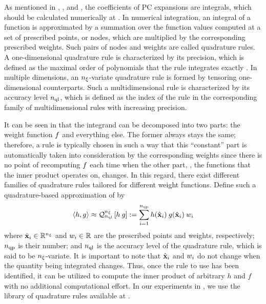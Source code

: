 As mentioned in , , and , the coefficients of PC expansions are integrals, which should be calculated numerically at .
In numerical integration, an integral of a function is approximated by a summation over the function values computed at a set of prescribed points, or nodes, which are multiplied by the corresponding prescribed weights.
Such pairs of nodes and weights are called quadrature rules.
A one-dimensional quadrature rule is characterized by its precision, which is defined as the maximal order of polynomials that the rule integrates exactly \cite{heiss2008}.
In multiple dimensions, an ${n_\xi}$-variate quadrature rule is formed by tensoring one-dimensional counterparts. Such a multidimensional rule is characterized by its accuracy level ${n_\text{ql}}$, which is defined as the index of the rule in the corresponding family of multidimensional rules with increasing precision.

It can be seen in  that the integrand can be decomposed into two parts: the weight function $f$ and everything else.
The former always stays the same; therefore, a rule is typically chosen in such a way that this ``constant'' part is automatically taken into consideration by the corresponding weights since there is no point of recomputing $f$ each time when the other part, \ie, the functions that the inner product operates on, changes.
In this regard, there exist different families of quadrature rules tailored for different weight functions.
Define such a quadrature-based approximation of  by
\begin{equation} \elabel{quadrature}
  \oInner{h}{g} \approx \oQuad{\nvars}{\qdlevel}{h \: g} := \sum_{i = 1}^{\qdorder} h(\qdn{\vX}_i) \: g(\qdn{\vX}_i) \: \qdw_i
\end{equation}
where $\hat{\mathbf{x}}_i \in \mathbb{R}^{n_\xi}$ and $w_i \in \mathbb{R}$ are the prescribed points and weights, respectively; ${n_\text{qp}}$ is their number; and ${n_\text{ql}}$ is the accuracy level of the quadrature rule, which is said to be ${n_\xi}$-variate.
It is important to note that $\hat{\mathbf{x}}_i$ and $w_i$ do not change when the quantity being integrated changes.
Thus, once the rule to use has been identified, it can be utilized to compute the inner product of arbitrary $h$ and $f$ with no additional computational effort.
In our experiments in , we use the library of quadrature rules available at \cite{burkardt2013}.

